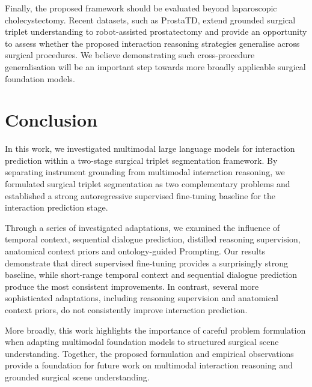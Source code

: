\documentclass[11pt]{article}
\begin{document}
Finally, the proposed framework should be evaluated beyond laparoscopic cholecystectomy. Recent datasets, such as ProstaTD, extend grounded surgical triplet understanding to robot-assisted prostatectomy and provide an opportunity to assess whether the proposed interaction reasoning strategies generalise across surgical procedures. We believe demonstrating such cross-procedure generalisation will be an important step towards more broadly applicable surgical foundation models.

\section{Conclusion}
In this work, we investigated multimodal large language models for interaction prediction within a two-stage surgical triplet segmentation framework. By separating instrument grounding from multimodal interaction reasoning, we formulated surgical triplet segmentation as two complementary problems and established a strong autoregressive supervised fine-tuning baseline for the interaction prediction stage.

Through a series of investigated adaptations, we examined the influence of temporal context, sequential dialogue prediction, distilled reasoning supervision, anatomical context priors and ontology-guided Prompting. Our results demonstrate that direct supervised fine-tuning provides a surprisingly strong baseline, while short-range temporal context and sequential dialogue prediction produce the most consistent improvements. In contrast, several more sophisticated adaptations, including reasoning supervision and anatomical context priors, do not consistently improve interaction prediction.

More broadly, this work highlights the importance of careful problem formulation when adapting multimodal foundation models to structured surgical scene understanding. Together, the proposed formulation and empirical observations provide a foundation for future work on multimodal interaction reasoning and grounded
surgical scene understanding.




\end{document}
